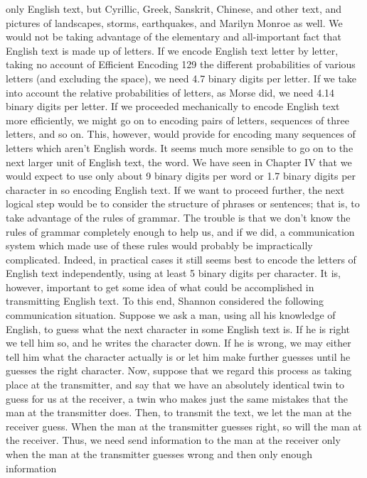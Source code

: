 {{{only English text, but Cyrillic, Greek, Sanskrit, Chinese, and other
text, and pictures of landscapes, storms, earthquakes, and Marilyn
Monroe as well. We would not be taking advantage of the elementary
and all-important fact that English text is made up of letters.
If we encode English text letter by letter, taking no account of
Efficient Encoding 129
the different probabilities of various letters (and excluding the
space), we need 4.7 binary digits per letter. If we take into account
the relative probabilities of letters, as Morse did, we need 4.14
binary digits per letter.
If we proceeded mechanically to encode English text more
efficiently, we might go on to encoding pairs of letters, sequences
of three letters, and so on. This, however, would provide for
encoding many sequences of letters which aren’t English words. It
seems much more sensible to go on to the next larger unit of
English text, the word. We have seen in Chapter IV that we would
expect to use only about 9 binary digits per word or 1.7 binary
digits per character in so encoding English text.
If we want to proceed further, the next logical step would be to
consider the structure of phrases or sentences; that is, to take
advantage of the rules of grammar. The trouble is that we don’t
know the rules of grammar completely enough to help us, and if
we did, a communication system which made use of these rules
would probably be impractically complicated. Indeed, in practical
cases it still seems best to encode the letters of English text independently,
using at least 5 binary digits per character.
It is, however, important to get some idea of what could be
accomplished in transmitting English text. To this end, Shannon
considered the following communication situation. Suppose we ask
a man, using all his knowledge of English, to guess what the next
character in some English text is. If he is right we tell him so, and
he writes the character down. If he is wrong, we may either tell
him what the character actually is or let him make further guesses
until he guesses the right character.
Now, suppose that we regard this process as taking place at the
transmitter, and say that we have an absolutely identical twin to
guess for us at the receiver, a twin who makes just the same mistakes
that the man at the transmitter does. Then, to transmit the
text, we let the man at the receiver guess. When the man at the
transmitter guesses right, so will the man at the receiver. Thus, we
need send information to the man at the receiver only when the
man at the transmitter guesses wrong and then only enough information
}}}
